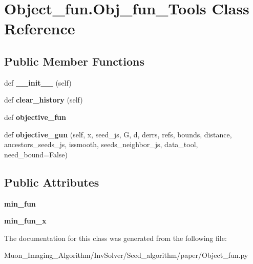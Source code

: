 \hypertarget{classObject__fun_1_1Obj__fun__Tools}{}\section{Object\+\_\+fun.\+Obj\+\_\+fun\+\_\+\+Tools Class Reference}
\label{classObject__fun_1_1Obj__fun__Tools}
\subsection*{Public Member Functions}
\begin{DoxyCompactItemize}
\item 
\mbox{\label{classObject__fun_1_1Obj__fun__Tools_a7af7f956db57d07a3413015f3af86423}} 
def {\bfseries \+\_\+\+\_\+init\+\_\+\+\_\+} (self)
\item 
\mbox{\label{classObject__fun_1_1Obj__fun__Tools_a79c735fea33ca02c3a899526409e3ea2}} 
def {\bfseries clear\+\_\+history} (self)
\item 
\mbox{\label{classObject__fun_1_1Obj__fun__Tools_a7aa83b3ef09bca3180fbec4542352603}} 
def {\bfseries objective\+\_\+fun}
\item 
\mbox{\label{classObject__fun_1_1Obj__fun__Tools_a693db70b562f84b5e36a92b8d13a5b7f}} 
def {\bfseries objective\+\_\+gun} (self, x, seed\+\_\+js, G, d, derrs, refs, bounds, distance, ancestors\+\_\+seeds\+\_\+js, issmooth, seeds\+\_\+neighbor\+\_\+js, data\+\_\+tool, need\+\_\+bound=False)
\end{DoxyCompactItemize}
\subsection*{Public Attributes}
\begin{DoxyCompactItemize}
\item 
\mbox{\label{classObject__fun_1_1Obj__fun__Tools_a32e3639c9a590c5c7c87c8faec1471f3}} 
{\bfseries min\+\_\+fun}
\item 
\mbox{\label{classObject__fun_1_1Obj__fun__Tools_a2eba468b5961a970e3d4617c5febc537}} 
{\bfseries min\+\_\+fun\+\_\+x}
\end{DoxyCompactItemize}


The documentation for this class was generated from the following file\+:\begin{DoxyCompactItemize}
\item 
Muon\+\_\+\+Imaging\+\_\+\+Algorithm/\+Inv\+Solver/\+Seed\+\_\+algorithm/paper/Object\+\_\+fun.\+py\end{DoxyCompactItemize}
